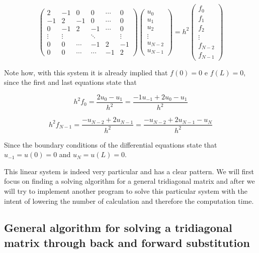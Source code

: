 \documentclass {article}
\begin{document}
\begin{equation}
 \begin{pmatrix}
   2 & -1 &  0 & 0 & \cdots & 0  \\
  -1 &  2 & -1 & 0 & \cdots & 0  \\
   0 &-1 &  2 & -1 & \cdots & 0 \\
  \vdots  & \vdots  & & \ddots & & \vdots   \\
   0 &  0 & \cdots  & -1 & 2 & -1 \\
   0 &  0 & \cdots & \cdots  & -1 & 2
 \end{pmatrix}
 \begin{pmatrix}
  u_0 \\
  u_1 \\
  u_2 \\
  \vdots  \\
  u_{N-2} \\
  u_{N-1} 
 \end{pmatrix}
 = h^2
 \begin{pmatrix}
  f_0 \\
  f_1 \\
  f_2 \\
  \vdots  \\
  f_{N-2} \\
  f_{N-1} 
 \end{pmatrix}
\end{equation}

Note how, with this system it is already implied that $f(0)=0$ e $f(L)=0$, since the first and last equations state that

$$h^2 f_0=\frac{2 u_0-u_1}{h^2}=\frac{-1 u_{-1}+2 u_0-u_1}{h^2}$$

$$h^2 f_{N-1}=\frac{-u_{N-2}+2 u_{N-1}}{h^2}=\frac{-u_{N-2}+2 u_{N-1}-u_N}{h^2}$$ 

Since the boundary conditions of the differential equations state that $u_{-1}=u(0)=0$ and $u_{N}=u(L)=0$.  

This linear system is indeed very particular and has a clear pattern. We will first focus on finding a solving algorithm for a general tridiagonal matrix and after we will try to implement another program to solve this particular system with the intent of lowering the number of calculation and therefore the computation time.

\subsection{General algorithm for solving a tridiagonal matrix through back and forward substitution}
\end{document}
